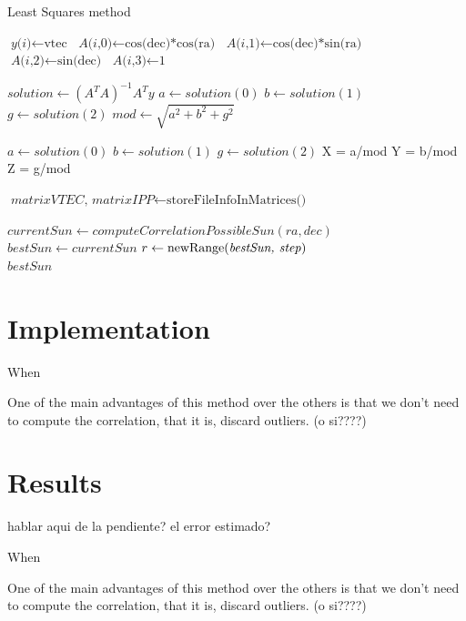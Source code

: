 \begin{algorithm}
	\caption{Least Squares method}\label{leastSquaresPseudo}
	\begin{algorithmic}[1]
		
		 
		\State $\textit{y(i)} \gets \text{vtec}$
		\State $\textit{A(i,0)} \gets \text{cos(dec)*cos(ra)}$
		\State $\textit{A(i,1)} \gets \text{cos(dec)*sin(ra)}$
		\State $\textit{A(i,2)} \gets \text{sin(dec)}$
		\State $\textit{A(i,3)} \gets \text{1}$
		\EndFor
		
		\State $\textit{solution} \gets (A^{T}A)^{-1}A^{T}y$ 
		\State $\textit{a} \gets solution(0)$
		\State $\textit{b} \gets solution(1)$
		\State $\textit{g} \gets solution(2)$
		\State $\textit{mod} \gets \sqrt{a^{2} + b^{2} + g^{2}}$ 
		
		
		\State $\textit{a} \gets solution(0)$
		\State $\textit{b} \gets solution(1)$
		\State $\textit{g} \gets solution(2)$
		X = a/mod
		Y = b/mod
		Z = g/mod
		
		\State $\textit{matrixVTEC, matrixIPP} \gets \text{storeFileInfoInMatrices()}$
		
		\State $currentSun \gets computeCorrelationPossibleSun(ra, dec)$
		\State $bestSun \gets currentSun$
		\State $r \gets \text{newRange(\textit{bestSun, step})}$
		\EndIf
		\EndFor
		\EndFor
		\EndFor
		\\
		\Return $bestSun$
		\EndProcedure
	\end{algorithmic}
\end{algorithm}

\section{Implementation}

When

One of the main advantages of this method over the others is that we don't need to compute the correlation, that it is, discard outliers. (o si????)

\section{Results}

hablar aqui de la pendiente? el error estimado?

When

One of the main advantages of this method over the others is that we don't need to compute the correlation, that it is, discard outliers. (o si????)

